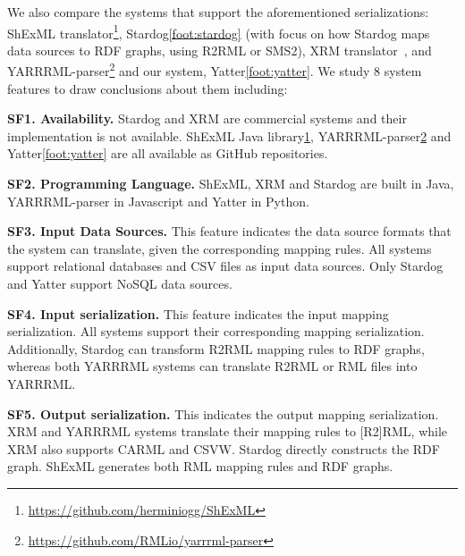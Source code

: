 We also compare the systems that support the aforementioned serializations: 
ShExML translator\footnote{\label{foot:shexml}\url{https://github.com/herminiogg/ShExML}}, %
Stardog\cref{foot:stardog} %
(with focus on how Stardog maps data sources to RDF graphs, using R2RML or SMS2),
XRM translator~\citep{xrm}, and
YARRRML-parser\footnote{\label{foot:yarrrml-p}\url{https://github.com/RMLio/yarrrml-parser}} and our system, Yatter\cref{foot:yatter}. 
We study 8 system features to draw conclusions about them including:

\textbf{SF1. Availability.}
Stardog and XRM are commercial systems and their implementation is not available. ShExML Java library\cref{foot:shexml}, YARRRML-parser\cref{foot:yarrrml-p} and Yatter\cref{foot:yatter} are all available as GitHub repositories. 

\textbf{SF2. Programming Language.} ShExML, XRM and Stardog are built in Java, YARRRML-parser in Javascript and Yatter in Python.

\textbf{SF3. Input Data Sources.} This feature indicates the data source formats that the system can translate, given the corresponding mapping rules. 
All systems support relational databases and CSV files as input data sources. Only Stardog and Yatter support NoSQL data sources.


\textbf{SF4. Input serialization.}
This feature indicates the input mapping serialization. 
All systems support their corresponding mapping serialization. 
Additionally, Stardog can transform R2RML mapping rules to RDF graphs, whereas both YARRRML systems can translate R2RML or RML files into YARRRML.

\textbf{SF5. Output serialization.} 
This indicates the output mapping serialization. 
XRM and YARRRML systems translate their mapping rules to [R2]RML, while XRM also supports CARML and CSVW. 
Stardog directly constructs the RDF graph. 
ShExML generates both RML mapping rules and RDF graphs.

